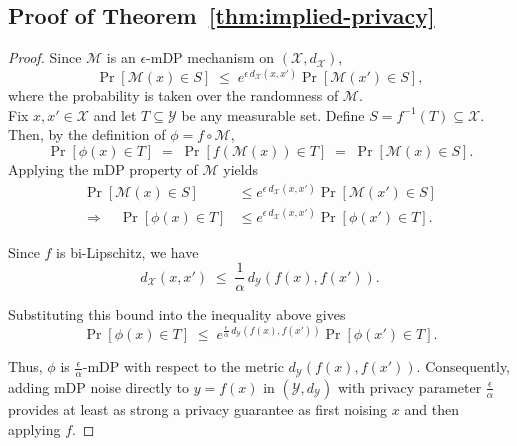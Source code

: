 \subsection{Proof of Theorem~\ref{thm:implied-privacy}}
\label{app:thm:implied-privacy}
\begin{proof}
Since $\mathcal{M}$ is an $\epsilon$-mDP mechanism on $(\mathcal{X}, d_\mathcal{X})$, 
\[
    \Pr[\mathcal{M}(x) \in S]
    \;\leq\;
    e^{\epsilon \, d_{\mathcal{X}}(x, x')}
    \Pr[\mathcal{M}(x') \in S],
\]
where the probability is taken over the randomness of $\mathcal{M}$. \\

\noindent Fix $x, x' \in \mathcal{X}$ and let $T \subseteq \mathcal{Y}$ be any measurable set.  
Define $S = f^{-1}(T) \subseteq \mathcal{X}$. \\

\noindent Then, by the definition of $\phi = f \circ \mathcal{M}$,
\[
    \Pr[\phi(x) \in T]
    \;=\;
    \Pr[f(\mathcal{M}(x)) \in T]
    \;=\;
    \Pr[\mathcal{M}(x) \in S].
\]
Applying the mDP property of $\mathcal{M}$ yields
\begin{align*}
    \Pr[\mathcal{M}(x) \in S]
    &\leq
    e^{\epsilon \, d_{\mathcal{X}}(x, x')}
    \Pr[\mathcal{M}(x') \in S] \\
    \Rightarrow \quad
    \Pr[\phi(x) \in T]
    &\leq
    e^{\epsilon \, d_{\mathcal{X}}(x, x')}
    \Pr[\phi(x') \in T].
\end{align*}

\noindent Since $f$ is bi-Lipschitz, we have
\[
    d_{\mathcal{X}}(x, x')
    \;\leq\;
    \frac{1}{\alpha} \, d_{\mathcal{Y}}(f(x), f(x')).
\]

\noindent Substituting this bound into the inequality above gives
\[
    \Pr[\phi(x) \in T]
    \;\leq\;
    e^{\frac{\epsilon}{\alpha} \, d_{\mathcal{Y}}(f(x), f(x'))}
    \Pr[\phi(x') \in T].
\]

\noindent Thus, $\phi$ is $\frac{\epsilon}{\alpha}$-mDP with respect to the metric $d_{\mathcal{Y}}(f(x), f(x'))$.  
Consequently, adding mDP noise directly to $y = f(x)$ in $(\mathcal{Y}, d_{\mathcal{Y}})$ with privacy parameter $\frac{\epsilon}{\alpha}$ provides at least as strong a privacy guarantee as first noising $x$ and then applying $f$.
\end{proof}

\label{app:fair-utility-details}
